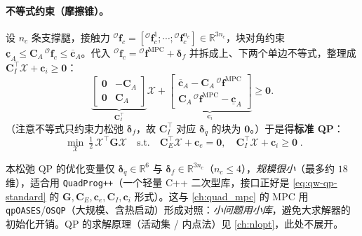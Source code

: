 \paragraph{不等式约束（摩擦锥）。}
设 $n_c$ 条支撑腿，接触力 ${}^{\mathcal{O}}\boldsymbol{f}_c=[{}^{\mathcal{O}}\boldsymbol{f}_c^1;\cdots;{}^{\mathcal{O}}\boldsymbol{f}_c^{n_c}]\in\mathbb{R}^{3n_c}$，块对角约束 $\underline{\boldsymbol{c}}_A\le\boldsymbol{C}_A\,{}^{\mathcal{O}}\boldsymbol{f}_c\le\overline{\boldsymbol{c}}_A$。代入 ${}^{\mathcal{O}}\boldsymbol{f}_c={}^{\mathcal{O}}\boldsymbol{f}^{\mathrm{MPC}}+\boldsymbol{\delta}_f$ 并拆成上、下两个单边不等式，整理成 $\boldsymbol{C}_I^\top\boldsymbol{\mathcal{X}}+\boldsymbol{c}_i\ge\mathbf{0}$\cite{yu2021quadruped}：
\begin{equation}
  \underbrace{\begin{bmatrix}\mathbf{0}&-\boldsymbol{C}_A\\\mathbf{0}&\boldsymbol{C}_A\end{bmatrix}}_{\boldsymbol{C}_I^\top}\boldsymbol{\mathcal{X}}
  +\underbrace{\begin{bmatrix}\overline{\boldsymbol{c}}_A-\boldsymbol{C}_A\,{}^{\mathcal{O}}\boldsymbol{f}^{\mathrm{MPC}}\\\boldsymbol{C}_A\,{}^{\mathcal{O}}\boldsymbol{f}^{\mathrm{MPC}}-\underline{\boldsymbol{c}}_A\end{bmatrix}}_{\boldsymbol{c}_i}\ge\mathbf{0}.
  \label{eq:qw-ineq-std}
\end{equation}
（注意不等式只约束力松弛 $\boldsymbol{\delta}_f$，故 $\boldsymbol{C}_I^\top$ 对应 $\boldsymbol{\delta}_{\ddot{q}}$ 的块为 $\mathbf{0}$。）于是得\textbf{标准 QP}\cite{yu2021quadruped}：
\begin{equation}
  \boxed{\;\min_{\boldsymbol{\mathcal{X}}}\ \tfrac12\,\boldsymbol{\mathcal{X}}^\top\boldsymbol{G}\boldsymbol{\mathcal{X}}
  \quad\text{s.t.}\quad
  \boldsymbol{C}_E^\top\boldsymbol{\mathcal{X}}+\boldsymbol{c}_e=\mathbf{0},\quad
  \boldsymbol{C}_I^\top\boldsymbol{\mathcal{X}}+\boldsymbol{c}_i\ge\mathbf{0}\;}.
  \label{eq:qw-qp-standard}
\end{equation}

\begin{practice}[QuadProg++ 选型]
本松弛 QP 的优化变量仅 $\boldsymbol{\delta}_{\ddot{q}}\in\mathbb{R}^6$ 与 $\boldsymbol{\delta}_f\in\mathbb{R}^{3n_c}$（$n_c\le4$），\emph{规模很小}（最多约 $18$ 维），适合用 \texttt{QuadProg++}（一个轻量 C++ 二次型库，接口正好是 \cref{eq:qw-qp-standard} 的 $\boldsymbol{G},\boldsymbol{C}_E,\boldsymbol{c}_e,\boldsymbol{C}_I,\boldsymbol{c}_i$ 形式）。这与 \cref{ch:quad_mpc} 的 MPC 用 \texttt{qpOASES}/\texttt{OSQP}（大规模、含热启动）形成对照：\emph{小问题用小库}，避免大求解器的初始化开销。QP 的求解原理（活动集 / 内点法）见 \cref{ch:nlopt}，此处不展开。
\end{practice}


